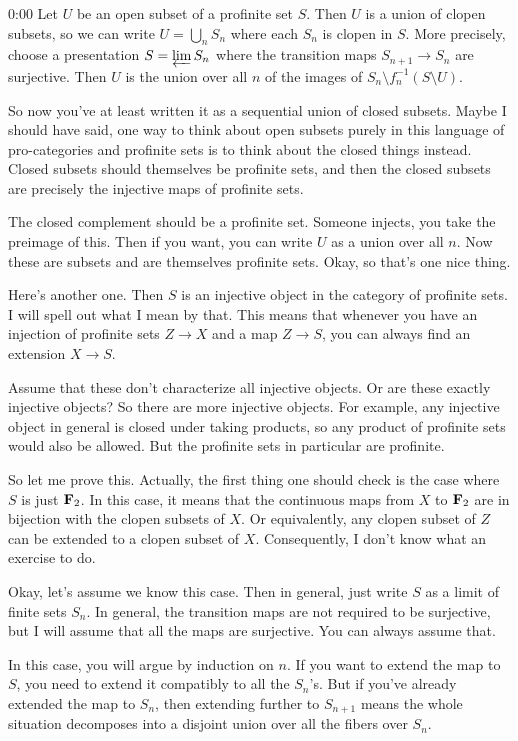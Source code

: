 \begin{unfinished}{0:00}
Let $U$ be an open subset of a profinite set $S$. Then $U$ is a union of clopen subsets, so we can write $U = \bigcup_{n} S_n$ where each $S_n$ is clopen in $S$. More precisely, choose a presentation $S = \varprojlim S_n$ where the transition maps $S_{n+1} \to S_n$ are surjective. Then $U$ is the union over all $n$ of the images of $S_n \setminus f_n^{-1}(S \setminus U)$.

So now you've at least written it as a sequential union of closed subsets. Maybe I should have said, one way to think about open subsets purely in this language of pro-categories and profinite sets is to think about the closed things instead. Closed subsets should themselves be profinite sets, and then the closed subsets are precisely the injective maps of profinite sets.

The closed complement should be a profinite set. Someone injects, you take the preimage of this. Then if you want, you can write $U$ as a union over all $n$. Now these are subsets and are themselves profinite sets. Okay, so that's one nice thing.

Here's another one. Then $S$ is an injective object in the category of profinite sets. I will spell out what I mean by that. This means that whenever you have an injection of profinite sets $Z \to X$ and a map $Z \to S$, you can always find an extension $X \to S$.

Assume that these don't characterize all injective objects. Or are these exactly injective objects? So there are more injective objects. For example, any injective object in general is closed under taking products, so any product of profinite sets would also be allowed. But the profinite sets in particular are profinite.

So let me prove this. Actually, the first thing one should check is the case where $S$ is just $\mathbf F_2$. In this case, it means that the continuous maps from $X$ to $\mathbf F_2$ are in bijection with the clopen subsets of $X$. Or equivalently, any clopen subset of $Z$ can be extended to a clopen subset of $X$. Consequently, I don't know what an exercise to do.

Okay, let's assume we know this case. Then in general, just write $S$ as a limit of finite sets $S_n$. In general, the transition maps are not required to be surjective, but I will assume that all the maps are surjective. You can always assume that.

In this case, you will argue by induction on $n$. If you want to extend the map to $S$, you need to extend it compatibly to all the $S_n$'s. But if you've already extended the map to $S_n$, then extending further to $S_{n+1}$ means the whole situation decomposes into a disjoint union over all the fibers over $S_n$.


\end{unfinished}
